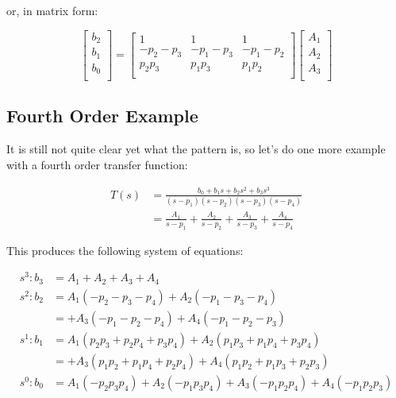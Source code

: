 or, in matrix form:

\begin{equation}
    \begin{bmatrix}
        b_2 \\
        b_1 \\
        b_0 \\
    \end{bmatrix} =
    \begin{bmatrix}
        1        & 1        & 1 \\
        -p_2-p_3 & -p_1-p_3 & -p_1-p_2 \\
        p_2p_3   & p_1p_3   & p_1p_2 \\
    \end{bmatrix}
    \begin{bmatrix}
        A_1 \\
        A_2 \\
        A_3 \\
    \end{bmatrix}
\end{equation}


\subsection{Fourth Order Example}

It  is  still  not  quite  clear yet what the pattern is, so let's do one more
example with a fourth order transfer function:

\begin{align}
    T(s) &= \frac{b_0 + b_1s + b_2s^2 + b_3s^3}{(s-p_1)(s-p_2)(s-p_3)(s-p_4)} \\
         &= \frac{A_1}{s-p_1} + \frac{A_2}{s-p_2} + \frac{A_3}{s-p_3} + \frac{A_4}{s-p_4}
\end{align}

This produces the following system of equations:

\begin{align*}
    s^3: b_3 &= A_1 + A_2 + A_3 + A_4 \\
    s^2: b_2 &= A_1(-p_2-p_3-p_4) + A_2(-p_1-p_3-p_4) \\
             &= + A_3(-p_1-p_2-p_4) + A_4(-p_1-p_2-p_3) \\
    s^1: b_1 &= A_1(p_2p_3+p_2p_4+p_3p_4) + A_2(p_1p_3+p_1p_4+p_3p_4) \\
             &= + A_3(p_1p_2+p_1p_4+p_2p_4) + A_4(p_1p_2+p_1p_3+p_2p_3) \\
    s^0: b_0 &= A_1(-p_2p_3p_4) + A_2(-p_1p_3p_4) + A_3(-p_1p_2p_4) + A_4(-p_1p_2p_3)
\end{align*}

